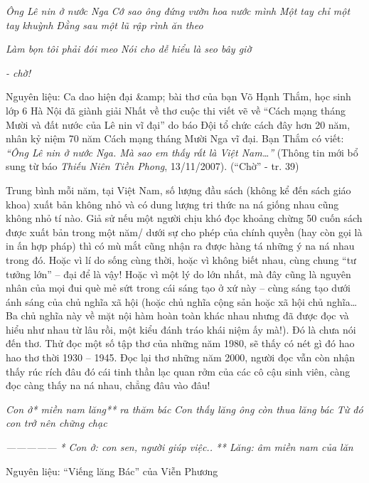 \documentclass[../main.tex]{subfiles}
\begin{document}
\begin{multicols}{2}
\begin{blockquote}
\textit{Ông Lê nin ở nước Nga} 
\textit{Cớ sao ông đứng vườn hoa nước mình} 
\textit{Một tay chỉ một tay khuỳnh} 
\textit{Đằng sau một lũ rập rình ăn theo} 

\textit{Làm bọn tôi phải đói meo} 
\textit{Nói cho dễ hiểu là seo bây giờ} 

\textit{- chờ!} 

Nguyên liệu: Ca dao hiện đại &amp; bài thơ của bạn Võ Hạnh Thắm, học sinh lớp 6 Hà Nội đã giành giải Nhất về thơ cuộc thi viết vẽ về “Cách mạng tháng Mười và đất nước của Lê nin vĩ đại” do báo Đội tổ chức cách đây hơn 20 năm, nhân kỷ niệm 70 năm Cách mạng tháng Mười Nga vĩ đại. Bạn Thắm có viết: \textit{“Ông Lê nin ở nước Nga. Mà sao em thấy rất là Việt Nam…”} (Thông tin mới bổ sung từ báo \textit{Thiếu Niên Tiền Phong}, 13/11/2007). 
\textit{}
(“Chờ” - tr. 39) 

\end{blockquote}


Trung bình mỗi năm, tại Việt Nam, số lượng đầu sách (không kể đến sách giáo khoa) xuất bản không nhỏ và có dung lượng tri thức na ná giống nhau cũng không nhỏ tí nào. Giả sử nếu một người chịu khó đọc khoảng chừng 50 cuốn sách được xuất bản trong một năm/ dưới sự cho phép của chính quyền (hay còn gọi là in ấn hợp pháp) thì có mù mắt cũng nhận ra được hàng tá những ý na ná nhau trong đó. Hoặc vì lí do sống cùng thời, hoặc vì không biết nhau, cùng chung “tư tưởng lớn” – đại để là vậy! Hoặc vì một lý do lớn nhất, mà đây cũng là nguyên nhân của mọi đui què mẻ sứt trong cái sáng tạo ở xứ này – cùng sáng tạo dưới ánh sáng của chủ nghĩa xã hội (hoặc chủ nghĩa cộng sản hoặc xã hội chủ nghĩa… Ba chủ nghĩa này về mặt nội hàm hoàn toàn khác nhau nhưng đã được đọc và hiểu như nhau từ lâu rồi, một kiểu đánh tráo khái niệm ấy mà!). Đó là chưa nói đến thơ. Thử đọc một số tập thơ của những năm 1980, sẽ thấy có nét gì đó hao hao thơ thời 1930 – 1945. Đọc lại thơ những năm 2000, người đọc vẫn còn nhận thấy rúc rích đâu đó cái tinh thần lạc quan rởm của các cô cậu sinh viên, càng đọc càng thấy na ná nhau, chẳng đâu vào đâu! 
\begin{blockquote}


\textit{Con ở* miền nam lăng** ra thăm bác} 
\textit{Con thấy lăng ông còn thua lăng bác} 
\textit{Từ đó con trở nên chững chạc} 

\textit{---------------} 
\small{\textit{* Con ở: con sen, người giúp việc..}} 
\small{\textit{** Lăng: âm miền nam của lăn}} 

Nguyên liệu: “Viếng lăng Bác” của Viễn Phương 


\end{blockquote}
\end{multicols}
\end{document}

